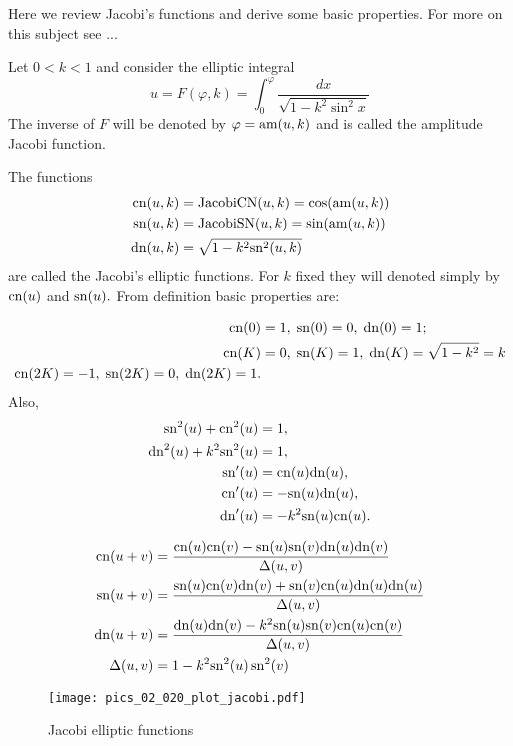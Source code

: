 Here we review Jacobi's functions and derive some basic properties. For more on this subject see ...

Let $0<k<1$ and consider the elliptic integral
\[u=F(\varphi,k)=\int_{0}^{\varphi} \frac {dx}{\sqrt {1-k^2   \sin^2 x  
}} \]
The inverse of $F$ will be denoted by $\varphi=\mathrm{am}(u,k)$ and is called the amplitude Jacobi function.

The functions
\begin{align*}
 \mathrm{cn}(u,k)&=\mathrm{JacobiCN}(u,k)=\cos(\mathrm{am}(u,k))\\ \;
 \mathrm{sn}(u,k)&=\mathrm{JacobiSN}(u,k)=\sin(\mathrm{am}(u,k))\\
 \mathrm{dn}(u,k)&=\sqrt{1-k^2\mathrm{sn}^2(u,k)}
 \end{align*}
\noindent  are called the Jacobi's elliptic  functions. 
For $k$ fixed they will denoted simply by $\mathrm{cn}(u)$ and $\mathrm{sn}(u).$
From definition basic properties are:

\begin{align*}
\mathrm{cn}(0)&=1,\; \mathrm{sn}(0)=0, \; \mathrm{dn}(0)=1;\\
\mathrm{cn}(K)&=0,\; \mathrm{sn}(K)=1, \; \mathrm{dn}(K)=\sqrt{1-k^2}=k\\
\mathrm{cn}(2K)=-1,\; \mathrm{sn}(2K)=0, \; \mathrm{dn}(2K)=1.
\end{align*}
Also,
\begin{align*}
 \mathrm{sn}^2(u)  +\mathrm{cn}^2(u)&=1,\\
 \mathrm{dn}^2 (u)+k^2\mathrm{sn}^2(u) &=1,\\
\mathrm{sn}'(u)&=\mathrm{cn}(u)\mathrm{dn}(u),\\
\mathrm{cn}'(u)&=-\mathrm{sn}(u)\mathrm{dn}(u),\\
\mathrm{dn}'(u)&=-k^2\mathrm{sn}(u)\mathrm{cn}(u).
\end{align*}

\begin{align*}
    \mathrm{cn}(u+v)&=\frac{\mathrm{cn}(u)\mathrm{cn}(v)-\mathrm{sn}(u)\mathrm{sn}(v)\mathrm{dn}(u)\mathrm{dn}(v)}{\Delta(u,v)}\\
    \mathrm{sn}(u+v)&=\frac{\mathrm{sn}(u)\mathrm{cn}(v)\mathrm{dn}(v)+\mathrm{sn}(v)\mathrm{cn}(u)\mathrm{dn}(u)\mathrm{dn}(u)}{\Delta(u,v)}\\
    \mathrm{dn}(u+v)&=\frac{\mathrm{dn}(u)\mathrm{dn}(v)-k^2\mathrm{sn}(u)\mathrm{sn}(v)\mathrm{cn}(u)\mathrm{cn}(v) }{\Delta(u,v)}\\
    \Delta(u,v)&=1-k^2\mathrm{sn}^2(u)\,\mathrm{sn}^2(v)
\end{align*}

\begin{figure}[H]
    \begin{center}
    \texttt{[image: pics\_02\_020\_plot\_jacobi.pdf]}
    \caption{Jacobi elliptic functions}
    \label{fig:jacobi_SCD}
    \end{center}
\end{figure}


